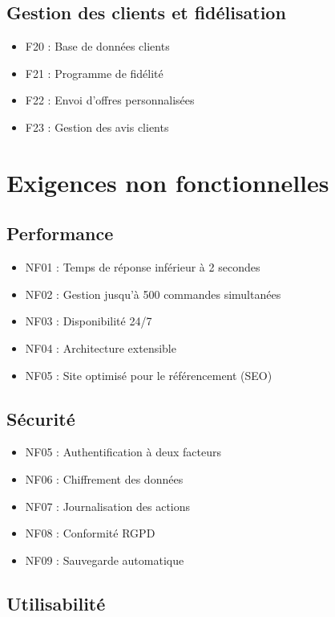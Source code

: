 \documentclass[12pt,a4paper]{article}
\begin{document}
\subsection{Gestion des clients et fidélisation}

\begin{itemize}
\item F20 : Base de données clients
\item F21 : Programme de fidélité
\item F22 : Envoi d'offres personnalisées
\item F23 : Gestion des avis clients  
\end{itemize}

\section{Exigences non fonctionnelles}

\subsection{Performance}

\begin{itemize}
\item NF01 : Temps de réponse inférieur à 2 secondes
\item NF02 : Gestion jusqu'à 500 commandes simultanées
\item NF03 : Disponibilité 24/7
\item NF04 : Architecture extensible
\item NF05 : Site optimisé pour le référencement (SEO)
\end{itemize}

\subsection{Sécurité}

\begin{itemize}
\item NF05 : Authentification à deux facteurs
\item NF06 : Chiffrement des données
\item NF07 : Journalisation des actions
\item NF08 : Conformité RGPD
\item NF09 : Sauvegarde automatique
\end{itemize}

\subsection{Utilisabilité}
\end{document}
